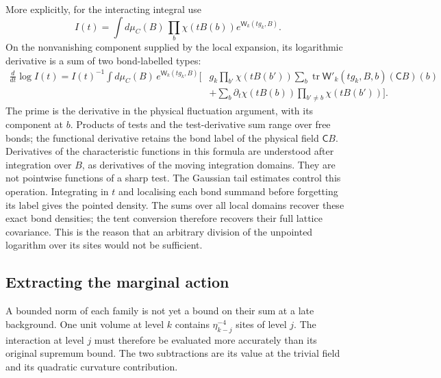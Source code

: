 \documentclass[11pt,letterpaper,reqno]{amsart}
\theoremstyle{definition}
\theoremstyle{remark}
\begin{document}
More explicitly, for the interacting
integral use
\[
 I(t)=\int d\mu_C(B)\,
          \prod_b\chi(tB(b))e^{\mathsf W_k(tg_k,B)}.
\]
On the nonvanishing component supplied
by the local expansion, its logarithmic
derivative is a sum of two bond-labelled
types:
\begin{equation}\label{eq:xrg-pointing-integral}
 \begin{split}
 \frac{d}{dt}\log I(t)
 =I(t)^{-1}\int d\mu_C(B)\,e^{\mathsf W_k(tg_k,B)}
 \bigg[&g_k\prod_{b'}\chi(tB(b'))
       \sum_b\operatorname{tr}
               \mathsf W'_k(tg_k,B,b)(\mathsf C B)(b)\\
 &+\sum_b\partial_t\chi(tB(b))
                       \prod_{b'\ne b}\chi(tB(b'))\bigg].
 \end{split}
\end{equation}
The prime is the derivative in the
physical fluctuation argument, with
its component at $b$. Products of
tests and the test-derivative sum
range over free bonds; the functional
derivative retains the bond label
of the physical field $\mathsf C B$.
Derivatives of
the characteristic functions in this
formula are understood after
integration over $B$, as derivatives
of the moving integration domains.
They are not pointwise functions of
a sharp test. The Gaussian tail
estimates control this operation.
Integrating in $t$ and localising
each bond summand before forgetting
its label gives the pointed density.
The sums over all local domains
recover these exact bond densities;
the tent conversion therefore
recovers their full lattice
covariance. This is the reason
that an arbitrary division of the
unpointed logarithm over its sites
would not be sufficient.

\subsection{Extracting the marginal action}

A bounded norm of each family is not yet a bound on their sum at a
late background. One unit volume at level $k$ contains
$\eta_{k-j}^{-4}$ sites of level $j$. The interaction at level $j$
must therefore be evaluated more accurately than its original
supremum bound. The two subtractions are its value at the trivial
field and its quadratic curvature contribution.
\end{document}
